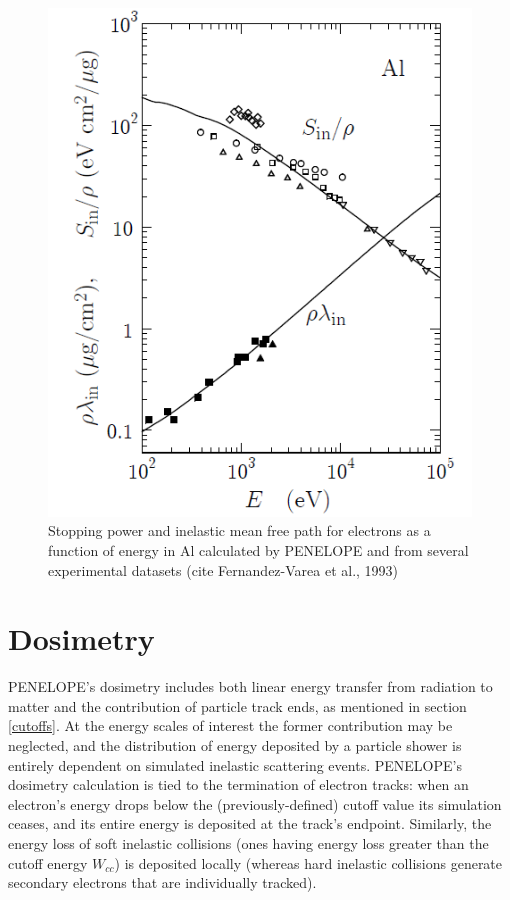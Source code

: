 \documentclass [11pt, proquest, article] {uwthesis}[2016/11/22]
\begin{document}



\begin{figure}[h] 
\caption{Stopping power and inelastic mean free path for electrons as a function of energy in Al calculated by PENELOPE and from several experimental datasets (cite Fernandez-Varea et al., 1993)}
\label{fig:stp_accuracy}
\centering
\includegraphics[scale=0.7]{../Figures/penelope_3_11.png}
\end{figure}

\section{Dosimetry}
PENELOPE's dosimetry includes both linear energy transfer from radiation to matter and the contribution of particle track ends, as mentioned in section \ref{cutoffs}. At the energy scales of interest the former contribution may be neglected, and the distribution of energy deposited by a particle shower is entirely dependent on simulated inelastic scattering events. PENELOPE's dosimetry calculation is tied to the termination of electron tracks: when an electron's energy drops below the (previously-defined) cutoff value its simulation ceases, and its entire energy is deposited at the track's endpoint.  Similarly, the energy loss of soft inelastic collisions (ones having energy loss greater than the cutoff energy $W_{cc}$) is deposited locally (whereas hard inelastic collisions generate secondary electrons that are individually tracked). 
\end{document}

